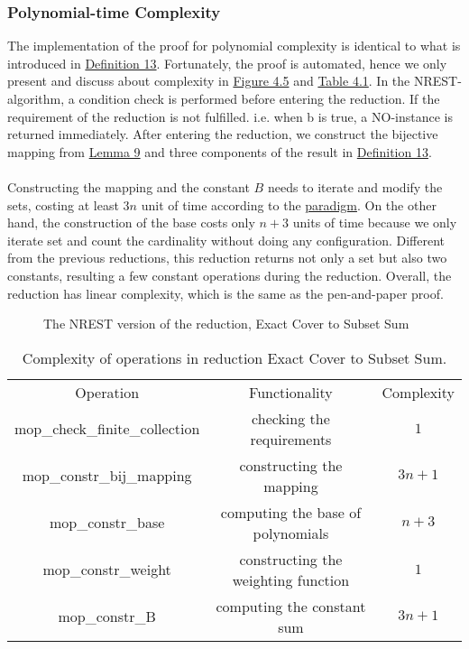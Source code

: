 \subsubsection{Polynomial-time Complexity}
The implementation of the proof for polynomial complexity is identical to what is introduced in \hyperref[def:13]{Definition 13}. 
Fortunately, the proof is automated, hence we only present and discuss about complexity in \hyperref[fig:4.5]{Figure 4.5} and \hyperref[table:4.1]{Table 4.1}.
In the NREST-algorithm, a condition check is performed before entering the reduction. 
If the requirement of the reduction is not fulfilled. i.e. when b is true, a NO-instance is returned immediately. 
After entering the reduction, we construct the bijective mapping from \hyperref[lemma:9]{Lemma 9} and three components of the result 
in \hyperref[def:13]{Definition 13}. \\\\
Constructing the mapping and the constant $B$ needs to iterate and modify the sets, 
costing at least $3n$ unit of time according to the \hyperref[para1]{paradigm}.  
On the other hand, the construction of the base costs only $n + 3$ units of time because we only iterate set and count the cardinality without doing any configuration.
Different from the previous reductions, this reduction returns not only a set but also two constants,
resulting a few constant operations during the reduction. Overall, the reduction has linear complexity,
which is the same as the pen-and-paper proof.
\begin{figure}[!h]
    \caption{The NREST version of the reduction, Exact Cover to Subset Sum}
    \label{fig:4.5}
\end{figure}
\begin{table}[!h]
    \centering
    \begin{tabular}{| c | c | c |}
        \hline 
        Operation & Functionality & Complexity \\ 
        \hhline{|=|=|=|}
        mop\_check\_finite\_collection & checking the requirements & $1$ \\ 
        \hline
        mop\_constr\_bij\_mapping & constructing the mapping & $3n + 1$ \\ 
        \hline
        mop\_constr\_base & computing the base of polynomials & $n + 3$ \\ 
        \hline
        mop\_constr\_weight & constructing the weighting function & $1$\\ 
        \hline
        mop\_constr\_B & computing the constant sum & $3n + 1$ \\
        \hline
    \end{tabular}
    \caption{Complexity of operations in reduction Exact Cover to Subset Sum.}
    \label{table:4.1}
\end{table}

